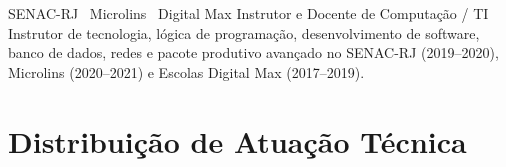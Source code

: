 \documentclass[singlesided,
               paper=a4,
               fontsize=9.5pt
              ]{my-resume}
\begin{document}
{    
        {SENAC-RJ \textbullet\ Microlins \textbullet\ Digital Max}
        {Instrutor e Docente de Computa\c{c}\~{a}o / TI}
        {Instrutor de tecnologia, l\'{o}gica de programa\c{c}\~{a}o, desenvolvimento de software, banco de dados, redes e pacote produtivo avan\c{c}ado no SENAC-RJ (2019--2020), Microlins (2020--2021) e Escolas Digital Max (2017--2019).}

    \section[\faPieChart]{Distribui\c{c}\~{a}o de Atua\c{c}\~{a}o T\'{e}cnica}
}

\makebody
\clearpage

\pagestyle{highlightmain}
\end{document}
